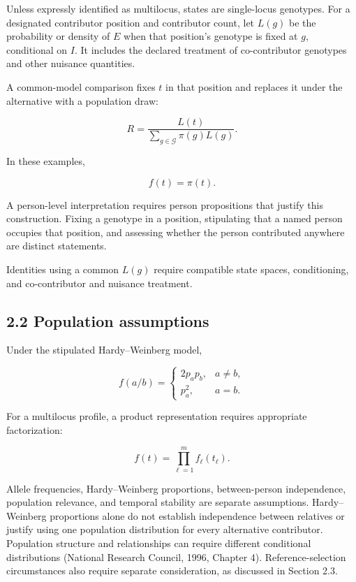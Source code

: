 \documentclass[
]{article}
\begin{document}
Unless expressly identified as multilocus, states are single-locus
genotypes. For a designated contributor position and contributor count,
let \(L(g)\) be the probability or density of \(E\) when that position's
genotype is fixed at \(g\), conditional on \(I\). It includes the
declared treatment of co-contributor genotypes and other nuisance
quantities.

A common-model comparison fixes \(t\) in that position and replaces it
under the alternative with a population draw:

\[
R=
\frac{L(t)}
{\sum_{g\in\mathcal G}\pi(g)L(g)}.
\]

In these examples,

\[
f(t)=\pi(t).
\]

A person-level interpretation requires person propositions that justify
this construction. Fixing a genotype in a position, stipulating that a
named person occupies that position, and assessing whether the person
contributed anywhere are distinct statements.

Identities using a common \(L(g)\) require compatible state spaces,
conditioning, and co-contributor and nuisance treatment.

\subsection{2.2 Population assumptions}\label{population-assumptions}

Under the stipulated Hardy--Weinberg model,

\[
f(a/b)=
\begin{cases}
2p_ap_b,&a\ne b,\\
p_a^2,&a=b.
\end{cases}
\]

For a multilocus profile, a product representation requires appropriate
factorization:

\[
f(t)=\prod_{\ell=1}^{m}f_\ell(t_\ell).
\]

Allele frequencies, Hardy--Weinberg proportions, between-person
independence, population relevance, and temporal stability are separate
assumptions. Hardy--Weinberg proportions alone do not establish
independence between relatives or justify using one population
distribution for every alternative contributor. Population structure and
relationships can require different conditional distributions (National
Research Council, 1996, Chapter 4). Reference-selection circumstances
also require separate consideration, as discussed in Section 2.3.
\end{document}
